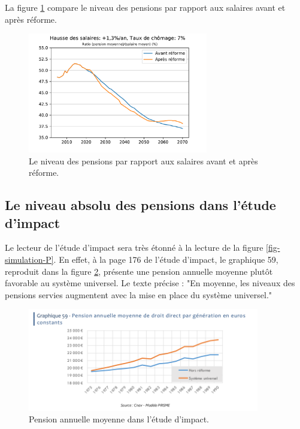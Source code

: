 \documentclass[10pt]{article}
\begin{document}
La figure \ref{fig-simulation-P-vs-COR} compare le niveau des pensions par rapport 
aux salaires avant et après réforme. 

\begin{figure}
\begin{center}
\includegraphics[width=0.7\textwidth]{Simulation-vs-avant-reforme-Pensions.pdf}
\end{center}
\caption{Le niveau des pensions par rapport aux salaires 
avant et après réforme.}
\label{fig-simulation-P-vs-COR}
\end{figure}


\subsection{Le niveau absolu des pensions dans l'étude d'impact}

Le lecteur de l'étude d'impact sera très étonné à la lecture de la figure 
\ref{fig-simulation-P}. 
En effet, à la page 176 de l'étude d'impact, le graphique 59, 
reproduit dans la figure \ref{fig-pension-annuelle-etude-impact}, 
présente une pension annuelle moyenne plutôt favorable au système 
universel.
Le texte précise : "En moyenne, les niveaux des pensions servies augmentent 
avec la mise en place du système universel."

\begin{figure}
\begin{center}
\includegraphics[width=0.9\textwidth]{../Figures-Etude-Impact/EtudeImpact-Graphique-59-PensionAnnuelle.png}
\end{center}

\caption{Pension annuelle moyenne dans l'étude d'impact.}
\label{fig-pension-annuelle-etude-impact}
\end{figure}
\end{document}
